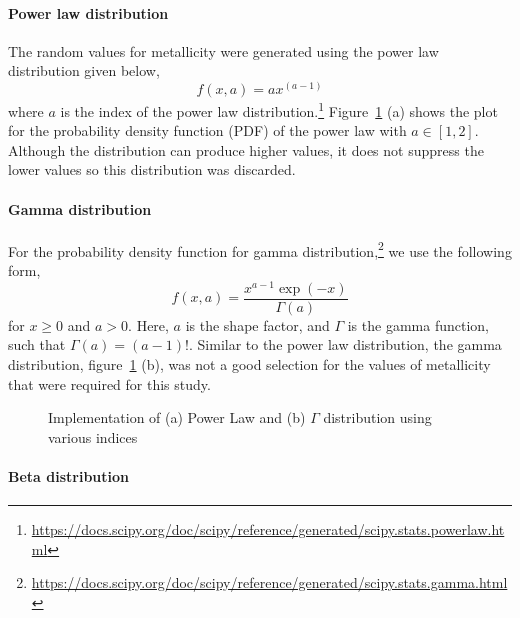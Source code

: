 \noindent\paragraph{Power law distribution}\label{par:power-law-distribution}
The random values for metallicity were generated using the power law distribution given below,
\begin{equation}
    f(x, a) = ax^{(a-1)}
    \label{eq:powerlaw_distribution}
\end{equation}
where $a$ is the index of the power law distribution.\footnote{\url{https://docs.scipy.org/doc/scipy/reference/generated/scipy.stats.powerlaw.html}}
Figure~\ref{fig:pl_gamma} (a) shows the plot for the probability density function (PDF) of the power law with $a \in [1, 2]$.
Although the distribution can produce higher values, it does not suppress the lower values so this distribution was discarded.

\paragraph{Gamma distribution}
\label{par:gamma-distribution}
For the probability density function for gamma distribution,\footnote{\url{https://docs.scipy.org/doc/scipy/reference/generated/scipy.stats.gamma.html}} we use the following form,
\begin{equation}
    f(x, a) = \frac{x^{a-1}\exp(-x)}{\Gamma(a)}
    \label{eq:gamma_distribution}
\end{equation}
for $x\geq 0$ and $a > 0$.
Here, $a$ is the shape factor, and $\Gamma$ is the gamma function, such that $\Gamma(a) = (a-1)!$.
Similar to the power law distribution, the gamma distribution, figure~\ref{fig:pl_gamma} (b), was not a good selection for the values of metallicity that were required for this study.

\begin{figure}[h]
	\centering
	\caption{Implementation of (a) Power Law and (b) $\Gamma$ distribution using various indices}
	\label{fig:pl_gamma}
\end{figure}

\paragraph{Beta distribution}
\label{par:beta-distribution}

